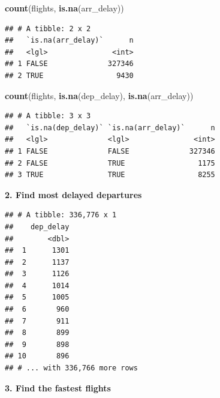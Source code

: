 \documentclass[]{book}
\newenvironment{Shaded}{\begin{snugshade}}{\end{snugshade}}
\newcommand{\KeywordTok}[1]{\textcolor[rgb]{0.13,0.29,0.53}{\textbf{#1}}}
\newcommand{\NormalTok}[1]{#1}
\newcommand{\OperatorTok}[1]{\textcolor[rgb]{0.81,0.36,0.00}{\textbf{#1}}}
\newcommand{\StringTok}[1]{\textcolor[rgb]{0.31,0.60,0.02}{#1}}
\theoremstyle{definition}
\theoremstyle{definition}
\theoremstyle{definition}
\theoremstyle{remark}
\begin{document}
\begin{Shaded}
\begin{Highlighting}[]
\KeywordTok{count}\NormalTok{(flights, }\KeywordTok{is.na}\NormalTok{(arr_delay))}
\end{Highlighting}
\end{Shaded}

\begin{verbatim}
## # A tibble: 2 x 2
##   `is.na(arr_delay)`      n
##   <lgl>               <int>
## 1 FALSE              327346
## 2 TRUE                 9430
\end{verbatim}

\begin{Shaded}
\begin{Highlighting}[]
\KeywordTok{count}\NormalTok{(flights, }\KeywordTok{is.na}\NormalTok{(dep_delay), }\KeywordTok{is.na}\NormalTok{(arr_delay))}
\end{Highlighting}
\end{Shaded}

\begin{verbatim}
## # A tibble: 3 x 3
##   `is.na(dep_delay)` `is.na(arr_delay)`      n
##   <lgl>              <lgl>               <int>
## 1 FALSE              FALSE              327346
## 2 FALSE              TRUE                 1175
## 3 TRUE               TRUE                 8255
\end{verbatim}

\textbf{2. Find most delayed departures}

\begin{Shaded}
\end{Shaded}

\begin{verbatim}
## # A tibble: 336,776 x 1
##    dep_delay
##        <dbl>
##  1      1301
##  2      1137
##  3      1126
##  4      1014
##  5      1005
##  6       960
##  7       911
##  8       899
##  9       898
## 10       896
## # ... with 336,766 more rows
\end{verbatim}

\textbf{3. Find the fastest flights}

\begin{Shaded}
\end{Shaded}
\end{document}
